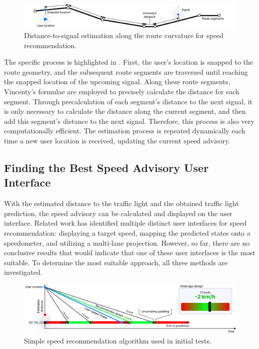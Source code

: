 \begin{figure}[htbp]
\centering
\includegraphics[width=\linewidth]{images/distance-to-signal-estimation.pdf}
\caption{Distance-to-signal estimation along the route curvature for speed recommendation.}
\label{fig:distance-to-signal-estimation}
\end{figure}

The specific process is highlighted in . First, the user's location is snapped to the route geometry, and the subsequent route segments are traversed until reaching the snapped location of the upcoming signal. Along these route segments, Vincenty's formulae are employed to precisely calculate the distance for each segment. Through precalculation of each segment's distance to the next signal, it is only necessary to calculate the distance along the current segment, and then add this segment's distance to the next signal. Therefore, this process is also very computationally efficient. The estimation process is repeated dynamically each time a new user location is received, updating the current speed advisory.

\subsection{Finding the Best Speed Advisory User Interface}

With the estimated distance to the traffic light and the obtained traffic light prediction, the speed advisory can be calculated and displayed on the user interface. Related work has identified multiple distinct user interfaces for speed recommendation: displaying a target speed, mapping the predicted states onto a speedometer, and utilizing a multi-lane projection. However, so far, there are no conclusive results that would indicate that one of these user interfaces is the most suitable. To determine the most suitable approach, all three methods are investigated.

\begin{figure}[htbp]
\centering
\includegraphics[width=\linewidth]{images/graph-based-speed-recommendation.pdf}
\caption{Simple speed recommendation algorithm used in initial tests.}
\label{fig:graph-based-speed-recommendation}
\end{figure}

